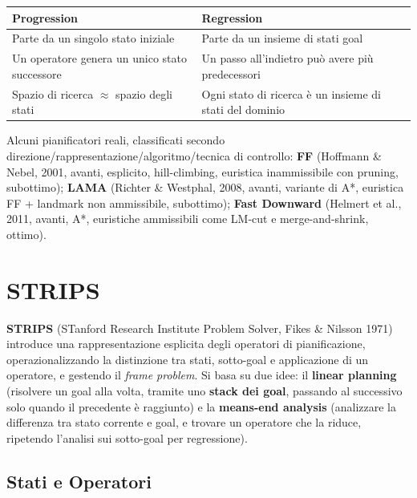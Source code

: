 \documentclass[a4paper,11pt]{article}
\begin{document}
\begin{center}
\small
\begin{tabular}{p{6.8cm}p{6.8cm}}
\toprule
\textbf{Progression} & \textbf{Regression} \\
\midrule
Parte da un singolo stato iniziale & Parte da un insieme di stati goal \\
Un operatore genera un unico stato successore & Un passo all'indietro può avere più predecessori \\
Spazio di ricerca $\approx$ spazio degli stati & Ogni stato di ricerca è un insieme di stati del dominio \\
\bottomrule
\end{tabular}
\end{center}

Alcuni pianificatori reali, classificati secondo direzione/rappresentazione/algoritmo/tecnica di controllo: \textbf{FF} (Hoffmann \& Nebel, 2001, avanti, esplicito, hill-climbing, euristica inammissibile con pruning, subottimo); \textbf{LAMA} (Richter \& Westphal, 2008, avanti, variante di A*, euristica FF + landmark non ammissibile, subottimo); \textbf{Fast Downward} (Helmert et al., 2011, avanti, A*, euristiche ammissibili come LM-cut e merge-and-shrink, ottimo).

\newpage
\section{STRIPS}
\label{sec:strips}

\textbf{STRIPS} (STanford Research Institute Problem Solver, Fikes \& Nilsson 1971) introduce una rappresentazione esplicita degli operatori di pianificazione, operazionalizzando la distinzione tra stati, sotto-goal e applicazione di un operatore, e gestendo il \emph{frame problem}. Si basa su due idee: il \textbf{linear planning} (risolvere un goal alla volta, tramite uno \textbf{stack dei goal}, passando al successivo solo quando il precedente è raggiunto) e la \textbf{means-end analysis} (analizzare la differenza tra stato corrente e goal, e trovare un operatore che la riduce, ripetendo l'analisi sui sotto-goal per regressione).

\subsection{Stati e Operatori}
\end{document}
